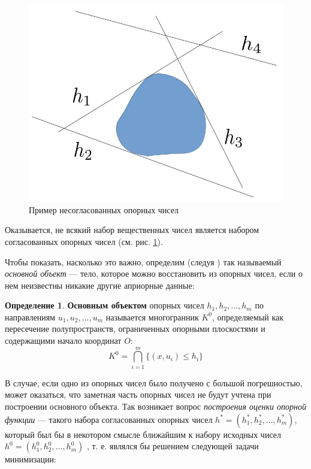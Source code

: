 \documentclass[a4paper, 10pt]{article}
\theoremstyle{definition}
\newtheorem{SmartDefinition}{Определение}
\theoremstyle{plain}
\theoremstyle{plain}
\begin{document}
\begin{figure}
 \begin{center}
  \includegraphics[scale=0.25]{images/Incosistency-example}
 \end{center}
 \caption{Пример несогласованных опорных чисел}
 \label{image:inconsistent}
\end{figure}

Оказывается, не всякий набор вещественных чисел является набором согласованных
опорных чисел (см. рис. \ref{image:inconsistent}).

Чтобы показать, насколько это важно, определим (следуя
\cite{PrinceWillsky}) так называемый \textit{основной объект} ---
тело, которое можно восстановить из опорных чисел, если о нем неизвестны никакие
другие априорные данные:

\begin{SmartDefinition}
 \label{def:basic-object}
 \textbf{Основным объектом} опорных чисел $h_{1}, h_{2}, \ldots, h_{m}$ по
 направлениям $u_{1}, u_{2}, \ldots, u_{m}$ называется многогранник $K^{0}$,
 определяемый как пересечение полупространств, ограниченных опорными плоскостями
 и содержащими начало координат $O$:
 \begin{equation*}
  K^{0} = \bigcap \limits_{i = 1}^{m}\{(x, u_{i}) \leq h_{i}\}
 \end{equation*}
\end{SmartDefinition}

В случае, если одно из опорных чисел было получено с большой погрешностью, может
оказаться, что заметная часть опорных чисел не будут учтена при построении
основного объекта. Так возникает вопрос \textit{построения оценки опорной
функции} --- такого набора согласованных опорных чисел
$h^{*} = (h^{*}_{1}, h^{*}_{2}, \ldots, h^{*}_{m})$, который был бы в некотором
смысле ближайшим к набору исходных чисел
$h^{0} = (h^{0}_{1}, h^{0}_{2}, \ldots, h^{0}_{m})$
, т. е. являлся бы решением следующей задачи
минимизации:
\end{document}

